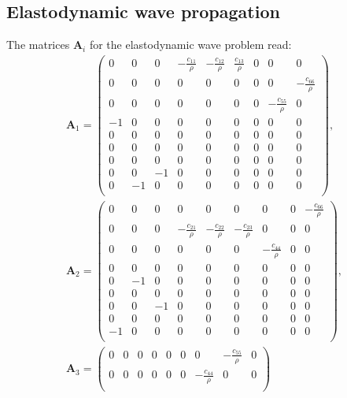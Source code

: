 \documentclass[a4paper]{article}
\renewcommand{\vec}{\boldsymbol}
\begin{document}
\subsection{Elastodynamic wave propagation}

The matrices $\vec{A}_{i}$ for the elastodynamic wave problem read:
\begin{multline}
  \vec{A}_1
  =
  \begin{pmatrix}
    0 & 0 & 0 & -\frac{c_{11}}{\rho} & -\frac{c_{12}}{\rho} &
    \frac{c_{13}}{\rho} &
    0 & 0 & 0\\
    0 & 0 & 0 & 0 & 0 & 0 & 0 & 0 & -\frac{c_{66}}{\rho} \\
    0 & 0 & 0 & 0 & 0 & 0 & 0 & -\frac{c_{55}}{\rho} & 0 \\
    -1 & 0 & 0 & 0 & 0 & 0 & 0 & 0 & 0 \\
    0 & 0 & 0 & 0 & 0 & 0 & 0 & 0 & 0 \\
    0 & 0 & 0 & 0 & 0 & 0 & 0 & 0 & 0 \\
    0 & 0 & 0 & 0 & 0 & 0 & 0 & 0 & 0 \\
    0 & 0 & -1 & 0 & 0 & 0 & 0 & 0 & 0 \\
    0 & -1 & 0 & 0 & 0 & 0 & 0 & 0 & 0 \\
  \end{pmatrix},\\
  \vec{A}_2
  =
  \begin{pmatrix}
    0 & 0 & 0 & 0 & 0 & 0 & 0 & 0 & -\frac{c_{66}}{\rho}\\
    0 & 0 & 0 & -\frac{c_{21}}{\rho} & -\frac{c_{22}}{\rho} &
    -\frac{c_{23}}{\rho}
    & 0 & 0 & 0 \\
    0 & 0 & 0 & 0 & 0 & 0 & -\frac{c_{44}}{\rho} & 0 & 0 \\
    0 & 0 & 0 & 0 & 0 & 0 & 0 & 0 & 0 \\
    0 & -1 & 0 & 0 & 0 & 0 & 0 & 0 & 0 \\
    0 & 0 & 0 & 0 & 0 & 0 & 0 & 0 & 0 \\
    0 & 0 & -1 & 0 & 0 & 0 & 0 & 0 & 0 \\
    0 & 0 & 0 & 0 & 0 & 0 & 0 & 0 & 0 \\
    -1 & 0 & 0 & 0 & 0 & 0 & 0 & 0 & 0 \\
  \end{pmatrix}, \\
  \vec{A}_3
  =
  \begin{pmatrix}
    0 & 0 & 0 & 0 & 0 & 0 & 0 & -\frac{c_{55}}{\rho} & 0\\
    0 & 0 & 0 & 0 & 0 & 0 & -\frac{c_{44}}{\rho} & 0 & 0 \\

\end{pmatrix}
\end{multline}
\end{document}

